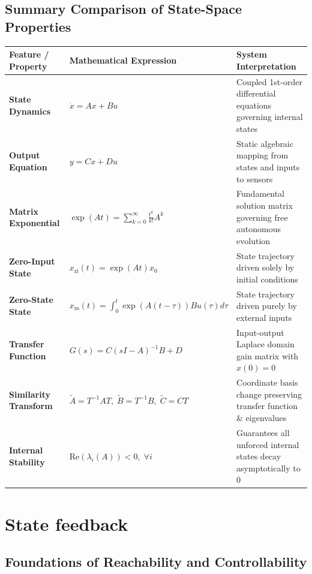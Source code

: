 \documentclass[12pt,onecolumn,twoside ]{article}
\begin{document}
	\subsection{Summary Comparison of State-Space Properties}
	\begin{center}\small\begin{tabularx}{\textwidth}{*{3}{Y}}
			\toprule
			\textbf{Feature / Property} & \textbf{Mathematical Expression} & \textbf{System Interpretation} \\
			\midrule
			\textbf{State Dynamics} & $\dot{x} = Ax + Bu$ & Coupled 1st-order differential equations governing internal states \\
			\textbf{Output Equation} & $y = Cx + Du$ & Static algebraic mapping from states and inputs to sensors \\
			\textbf{Matrix Exponential} & $\exp(At) = \sum_{k=0}^{\infty} \frac{t^k}{k!} A^k$ & Fundamental solution matrix governing free autonomous evolution \\
			\textbf{Zero-Input State} & $x_{\text{zi}}(t) = \exp(At)x_0$ & State trajectory driven solely by initial conditions \\
			\textbf{Zero-State State} & $x_{\text{zs}}(t) = \int_{0}^t \exp(A(t-\tau))Bu(\tau)d\tau$ & State trajectory driven purely by external inputs \\
			\textbf{Transfer Function} & $G(s) = C(sI - A)^{-1}B + D$ & Input-output Laplace domain gain matrix with $x(0) = 0$ \\
			\textbf{Similarity Transform} & $\tilde{A} = T^{-1}AT,\; \tilde{B} = T^{-1}B,\; \tilde{C} = CT$ & Coordinate basis change preserving transfer function \& eigenvalues \\
			\textbf{Internal Stability} & $\text{Re}(\lambda_i(A)) < 0,\; \forall i$ & Guarantees all unforced internal states decay asymptotically to 0 \\
			\bottomrule
	\end{tabularx}\end{center}
	
	\newpage
	\section{State feedback}
	
	\subsection{Foundations of Reachability and Controllability}
\end{document}
